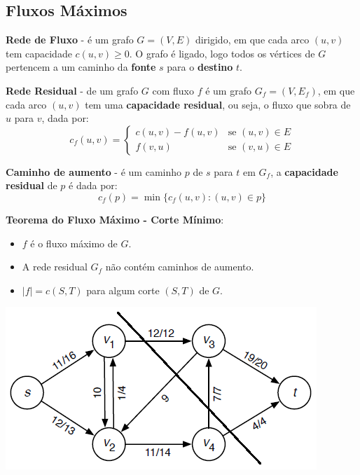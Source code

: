 \documentclass[11pt]{article}
\newcommand{\twopartdef}[4]
{ \displaystyle
	\left\{
		\begin{array}{ll}
			#1 & \mbox{se } #2 \\
			#3 & \mbox{se } #4
		\end{array}
	\right.
}
\begin{document}
\subsection{Fluxos Máximos} 

\textbf{Rede de Fluxo} - é um grafo $G=(V,E)$ dirigido, em que cada arco $(u,v)$ tem capacidade $c(u,v) \ge 0$. O grafo é ligado, logo todos os vértices de $G$ pertencem a um caminho da \textbf{fonte} $s$ para o \textbf{destino} $t$.

\textbf{Rede Residual} - de um grafo $G$ com fluxo $f$ é um grafo $G_f=(V,E_f)$, em que cada arco $(u,v)$ tem uma \textbf{capacidade residual}, ou seja, o fluxo que sobra de $u$ para $v$, dada por:
\begin{equation*}
    c_f(u,v)=\twopartdef{c(u,v)-f(u,v)}{(u,v) \in E}
    {f(v,u)}{(v,u) \in E}
\end{equation*}

\textbf{Caminho de aumento} - é um caminho $p$ de $s$ para $t$ em $G_f$, a \textbf{capacidade residual} de $p$ é dada por:
\begin{equation*}
    c_f(p)=\min\{c_f(u,v): (u, v)\in p\}
\end{equation*}

\begin{minipage}{0.50\textwidth}
    \textbf{Teorema do Fluxo Máximo - Corte Mínimo}:
    \begin{itemize}[topsep=0pt]
        \item $f$ é o fluxo máximo de $G$.
        \item A rede residual $G_f$ não contém caminhos de aumento.
        \item $|f| = c(S,T)$ para algum corte $(S,T)$ de $G$.
    \end{itemize}
\end{minipage}
\begin{minipage}{0.49\textwidth}
    \includegraphics[scale=0.6,right]{max_flow_min_cut.png}
\end{minipage}
\end{document}

